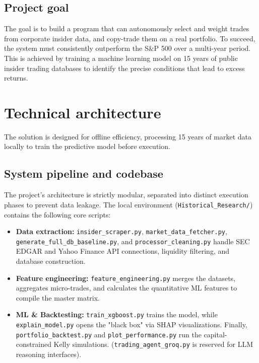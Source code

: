 \documentclass{article}
\begin{document}
\subsection{Project goal}
The goal is to build a program that can autonomously select and weight trades from corporate insider data, and copy-trade them on a real portfolio. To succeed, the system must consistently outperform the S\&P 500 over a multi-year period. This is achieved by training a machine learning model on 15 years of public insider trading databases to identify the precise conditions that lead to excess returns.

\section{Technical architecture}
The solution is designed for offline efficiency, processing 15 years of market data locally to train the predictive model before execution. 

\subsection{System pipeline and codebase}
The project's architecture is strictly modular, separated into distinct execution phases to prevent data leakage. The local environment (\texttt{Historical\_Research/}) contains the following core scripts:

\begin{itemize}
    \item \textbf{Data extraction:} \texttt{insider\_scraper.py}, \texttt{market\_data\_fetcher.py}, \texttt{generate\_full\_db\_baseline.py}, and \texttt{processor\_cleaning.py} handle SEC EDGAR and Yahoo Finance API connections, liquidity filtering, and database construction.
    \item \textbf{Feature engineering:} \texttt{feature\_engineering.py} merges the datasets, aggregates micro-trades, and calculates the quantitative ML features to compile the master matrix.
    \item \textbf{ML \& Backtesting:} \texttt{train\_xgboost.py} trains the model, while \texttt{explain\_model.py} opens the "black box" via SHAP visualizations. Finally, \texttt{portfolio\_backtest.py} and \texttt{plot\_performance.py} run the capital-constrained Kelly simulations. (\texttt{trading\_agent\_groq.py} is reserved for LLM reasoning interfaces).
\end{itemize}
\end{document}
